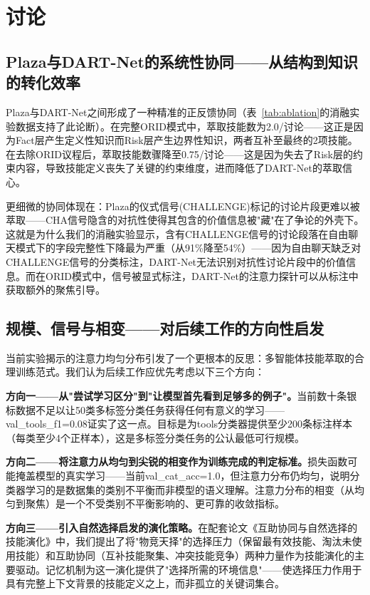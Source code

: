 \documentclass[twocolumn,10.5pt]{ctexart}
\begin{document}
\section{讨论}

\subsection{Plaza与DART-Net的系统性协同——从结构到知识的转化效率}

Plaza与DART-Net之间形成了一种精准的正反馈协同（表~\ref{tab:ablation}的消融实验数据支持了此论断）。在完整ORID模式中，萃取技能数为2.0/讨论——这正是因为Fact层产生定义性知识而Risk层产生边界性知识，两者互补至最终的2项技能。在去除ORID议程后，萃取技能数骤降至0.75/讨论——这是因为失去了Risk层的约束内容，导致技能定义丧失了关键的约束维度，进而降低了DART-Net的萃取信心。

更细微的协同体现在：Plaza的仪式信号(CHALLENGE)标记的讨论片段更难以被萃取——CHA信号隐含的对抗性使得其包含的价值信息被"藏"在了争论的外壳下。这就是为什么我们的消融实验显示，含有CHALLENGE信号的讨论段落在自由聊天模式下的字段完整性下降最为严重（从91\%降至54\%）——因为自由聊天缺乏对CHALLENGE信号的分类标注，DART-Net无法识别对抗性讨论片段中的价值信息。而在ORID模式中，信号被显式标注，DART-Net的注意力探针可以从标注中获取额外的聚焦引导。

\subsection{规模、信号与相变——对后续工作的方向性启发}

当前实验揭示的注意力均匀分布引发了一个更根本的反思：多智能体技能萃取的合理训练范式。我们认为后续工作应优先考虑以下三个方向：

\textbf{方向一——从"尝试学习区分"到"让模型首先看到足够多的例子"。}当前数十条银标数据不足以让50类多标签分类任务获得任何有意义的学习——val\_tools\_f1=0.08证实了这一点。目标是为tools分类器提供至少200条标注样本（每类至少4个正样本），这是多标签分类任务的公认最低可行规模。

\textbf{方向二——将注意力从均匀到尖锐的相变作为训练完成的判定标准。}损失函数可能掩盖模型的真实学习——当前val\_cat\_acc=1.0，但注意力分布仍均匀，说明分类器学习的是数据集的类别不平衡而非模型的语义理解。注意力分布的相变（从均匀到聚焦）是一个不受类别不平衡影响的、更可靠的收敛指标。

\textbf{方向三——引入自然选择启发的演化策略。}在配套论文《互助协同与自然选择的技能演化》中，我们提出了将"物竞天择"的选择压力（保留最有效技能、淘汰未使用技能）和互助协同（互补技能聚集、冲突技能竞争）两种力量作为技能演化的主要驱动。记忆机制为这一演化提供了"选择所需的环境信息"——使选择压力作用于具有完整上下文背景的技能定义之上，而非孤立的关键词集合。
\end{document}
